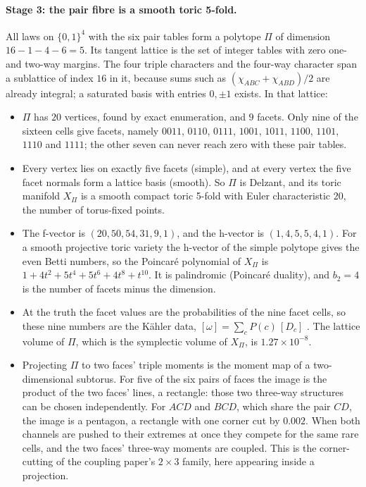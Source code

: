 \documentclass[11pt]{article}
\theoremstyle{definition}\newtheorem{definition}{Definition}\newtheorem{remark}{Remark}
\begin{document}
\paragraph{Stage 3: the pair fibre is a smooth toric 5-fold.} All laws on $\{0,1\}^4$ with the six pair tables form a polytope $\Pi$
of dimension $16-1-4-6=5$. Its tangent lattice is the set of integer tables with zero one- and two-way margins. The four triple
characters and the four-way character span a sublattice of index $16$ in it, because sums such as $(\chi_{ABC}+\chi_{ABD})/2$ are
already integral; a saturated basis with entries $0,\pm1$ exists. In that lattice:
\begin{itemize}
\item $\Pi$ has $20$ vertices, found by exact enumeration, and $9$ facets. Only nine of the sixteen cells give facets, namely $0011$,
  $0110$, $0111$, $1001$, $1011$, $1100$, $1101$, $1110$ and $1111$; the other seven can never reach zero with these pair tables.
\item Every vertex lies on exactly five facets (simple), and at every vertex the five facet normals form a lattice basis (smooth). So
  $\Pi$ is Delzant, and its toric manifold $X_\Pi$ is a smooth compact toric 5-fold \cite{Delzant1988} with Euler characteristic $20$,
  the number of torus-fixed points.
\item The f-vector is $(20,50,54,31,9,1)$, and the h-vector is $(1,4,5,5,4,1)$. For a smooth projective toric variety the h-vector of
  the simple polytope gives the even Betti numbers, so the Poincaré polynomial of $X_\Pi$ is $1+4t^2+5t^4+5t^6+4t^8+t^{10}$. It is
  palindromic (Poincaré duality), and $b_2=4$ is the number of facets minus the dimension.
\item At the truth the facet values are the probabilities of the nine facet cells, so these nine numbers are the Kähler data,
  $[\omega]=\sum_c P(c)\,[D_c]$ \cite[Prop.~2.2]{Coupling}. The lattice volume of $\Pi$, which is the symplectic volume of $X_\Pi$, is
  $1.27\times10^{-8}$.
\item Projecting $\Pi$ to two faces' triple moments is the moment map of a two-dimensional subtorus. For five of the six pairs of
  faces the image is the product of the two faces' lines, a rectangle: those two three-way structures can be chosen independently. For
  $ACD$ and $BCD$, which share the pair $CD$, the image is a pentagon, a rectangle with one corner cut by $0.002$. When both channels
  are pushed to their extremes at once they compete for the same rare cells, and the two faces' three-way moments are coupled. This is
  the corner-cutting of the coupling paper's $2\times3$ family, here appearing inside a projection.
\end{itemize}
\end{document}
